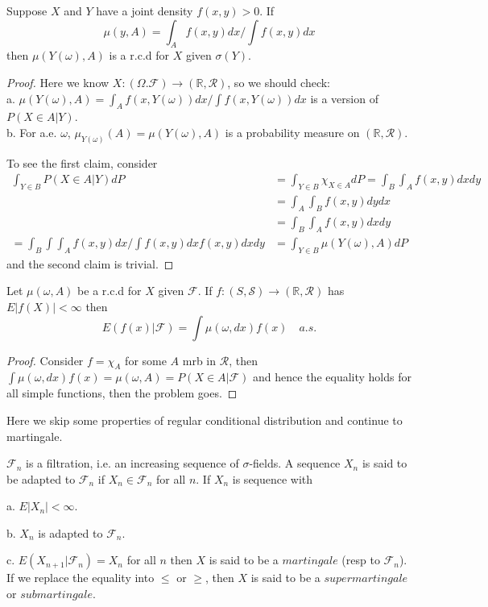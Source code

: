 \documentclass[lang=en, color=blue, ]{elegantbook}
\newcommand{\F}{\mathcal{F}}
\newcommand{\R}{\mathbb{R}}
\begin{document}
\begin{proposition}
    Suppose $X$ and $Y$ have a joint density $f(x,y)>0$. If
    \[\mu(y,A) = \int_A f(x,y)dx/\int f(x,y)dx\]
    then $\mu(Y(\omega),A)$ is a r.c.d for $X$ given $\sigma(Y)$.
\end{proposition}
\begin{proof}\par
    Here we know $X:(\Omega.\F) \to (\R,\mathcal{R})$, so we should check:\\
    a. $\mu(Y(\omega), A) = \int_A f(x,Y(\omega))dx/\int f(x,Y(\omega))dx$ is a version of $P(X\in A|Y)$.\\
    b. For a.e. $\omega$, $\mu_{Y(\omega)}(A) = \mu(Y(\omega),A)$ is a probability measure on $(\R,\mathcal{R})$.\par
    To see the first claim, consider
    \[
    \begin{aligned}
    \int_{Y\in B} P(X\in A|Y) dP &= \int_{Y\in B} \chi_{X\in A} dP = \int_B\int_A f(x,y)dxdy \\&= \int_A \int_B f(x,y)dy dx \\
    & = \int_B \int_A f(x,y)dx dy \\
    =\int_B \int \int_A f(x,y) dx / \int f(x,y)dx f(x,y) dx dy 
    &= \int_{Y\in B} \mu(Y(\omega), A) dP
    \end{aligned}
    \]
    and the second claim is trivial.
\end{proof}
\begin{theorem}
    Let $\mu(\omega,A)$ be a r.c.d for $X$ given $\F$. If $f:(S,\mathcal{S}) \to (\R,\mathcal{R})$ has $E|f(X)|<\infty$ then
    \[E(f(x)|\F) = \int \mu(\omega,dx)f(x)\quad a.s.\]
\end{theorem}
\begin{proof}\par
    Consider $f= \chi_A$ for some $A$ mrb in $\mathcal{R}$, then $\int \mu(\omega, dx)f(x) = \mu(\omega, A) = P(X\in A|\F)$
    and hence the equality holds for all simple functions, then the problem goes.\par
\end{proof}

Here we skip some properties of regular conditional distribution and continue to martingale.\par

\begin{definition}
    $\F_n$ is a filtration, i.e. an increasing sequence of $\sigma$-fields. A sequence $X_n$ is said to be adapted to $\F_n$ if $X_n\in\F_n$ for all $n$. If $X_n$ is sequence with\par
    a. $E|X_n| < \infty$.\par
    b. $X_n$ is adapted to $\F_n$.\par
    c. $E(X_{n+1}|\F_n) = X_n$ for all $n$
    then $X$ is said to be a $martingale$ (resp to $\F_n$). If we replace the equality into $\leq$ or $\geq$, then $X$ is said to be a $supermartingale$ or $submartingale$.\par 
\end{definition}
\end{document}
